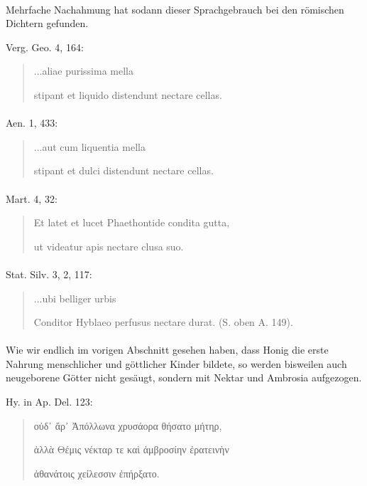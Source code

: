 \documentclass[a4paper, 11pt, oneside]{article}
\begin{document}
\paragraph{}
Mehrfache Nachahmung hat sodann dieser Sprachgebrauch bei den römischen Dichtern gefunden.

Verg. Geo. 4, 164:
\begin{quotation}
\hspace*{5mm}...aliae purissima mella

stipant et liquido distendunt nectare cellas.
\end{quotation}
\paragraph{}
Aen. 1, 433:
\begin{quotation}
\hspace*{5mm}...aut cum liquentia mella

stipant et dulci distendunt nectare cellas.
\end{quotation}
\paragraph{}
Mart. 4, 32:
\begin{quotation}
Et latet et lucet Phaethontide condita gutta,

ut videatur apis nectare clusa suo.
\end{quotation}
\paragraph{}
Stat. Silv. 3, 2, 117:
\begin{quotation}
\hspace*{5mm}...ubi belliger urbis

Conditor Hyblaeo perfusus nectare durat. (S. oben A. 149).
\end{quotation}
\paragraph{}
Wie wir endlich im vorigen Abschnitt gesehen haben, dass Honig die erste Nahrung menschlicher und göttlicher Kinder bildete, so werden bisweilen auch neugeborene Götter nicht gesäugt, sondern mit Nektar und Ambrosia aufgezogen.

Hy. in Ap. Del. 123:
\begin{quotation}
οὐδ᾽ ἄρ᾽ Ἀπόλλωνα χρυσάορα θήσατο μήτηρ,

ἀλλὰ Θέμις νέκταρ τε καὶ ἀμβροσίην ἐρατεινὴν

ἀθανάτοις χείλεσσιν ἐπήρξατο.
\end{quotation}
\end{document}
